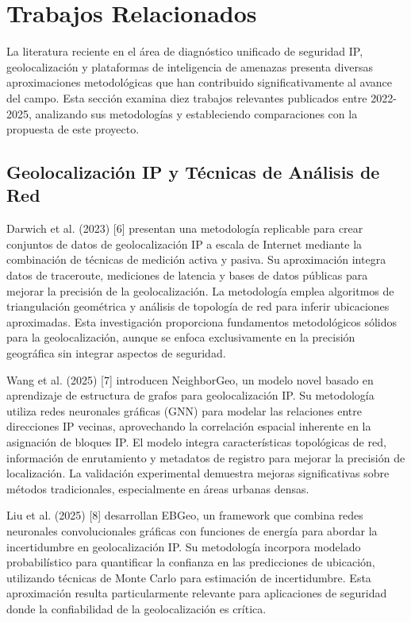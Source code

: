 \section{Trabajos Relacionados}

La literatura reciente en el área de diagnóstico unificado de seguridad IP, geolocalización y plataformas de inteligencia de amenazas presenta diversas aproximaciones metodológicas que han contribuido significativamente al avance del campo. Esta sección examina diez trabajos relevantes publicados entre 2022-2025, analizando sus metodologías y estableciendo comparaciones con la propuesta de este proyecto.

\subsection{Geolocalización IP y Técnicas de Análisis de Red}

Darwich et al. (2023) [6] presentan una metodología replicable para crear conjuntos de datos de geolocalización IP a escala de Internet mediante la combinación de técnicas de medición activa y pasiva. Su aproximación integra datos de traceroute, mediciones de latencia y bases de datos públicas para mejorar la precisión de la geolocalización. La metodología emplea algoritmos de triangulación geométrica y análisis de topología de red para inferir ubicaciones aproximadas. Esta investigación proporciona fundamentos metodológicos sólidos para la geolocalización, aunque se enfoca exclusivamente en la precisión geográfica sin integrar aspectos de seguridad.

Wang et al. (2025) [7] introducen NeighborGeo, un modelo novel basado en aprendizaje de estructura de grafos para geolocalización IP. Su metodología utiliza redes neuronales gráficas (GNN) para modelar las relaciones entre direcciones IP vecinas, aprovechando la correlación espacial inherente en la asignación de bloques IP. El modelo integra características topológicas de red, información de enrutamiento y metadatos de registro para mejorar la precisión de localización. La validación experimental demuestra mejoras significativas sobre métodos tradicionales, especialmente en áreas urbanas densas.

Liu et al. (2025) [8] desarrollan EBGeo, un framework que combina redes neuronales convolucionales gráficas con funciones de energía para abordar la incertidumbre en geolocalización IP. Su metodología incorpora modelado probabilístico para quantificar la confianza en las predicciones de ubicación, utilizando técnicas de Monte Carlo para estimación de incertidumbre. Esta aproximación resulta particularmente relevante para aplicaciones de seguridad donde la confiabilidad de la geolocalización es crítica.

